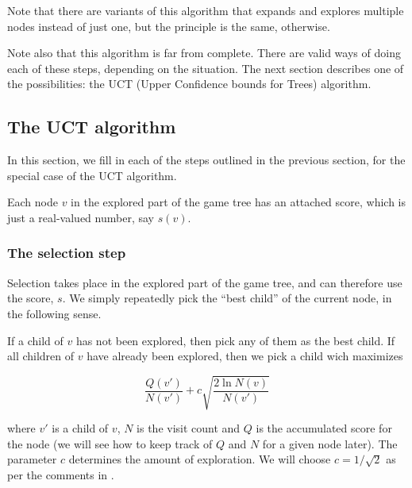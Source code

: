 Note that there are variants of this algorithm that expands and explores multiple nodes instead of just one, but the principle is the same, otherwise.

Note also that this algorithm is far from complete. There are valid ways of doing each of these steps, depending on the situation.
The next section describes one of the possibilities: the UCT (Upper Confidence bounds for Trees) algorithm.


\subsection{The UCT algorithm}

In this section, we fill in each of the steps outlined in the previous section, for the special case of the UCT algorithm.


Each node $v$ in the explored part of the game tree has an attached score, which is just a real-valued number, say $s(v)$.


\subsubsection{The selection step}

Selection takes place in the explored part of the game tree, and can therefore use the score, $s$.
We simply repeatedly pick the ``best child'' of the current node, in the following sense.

If a child of $v$ has not been explored, then pick any of them as the best child.
If all children of $v$ have already been explored, then we pick a child wich maximizes 

\[
\frac{Q(v')}{N(v')} + c\sqrt{\frac{2\ln{N(v)}}{N(v')}}
\] 


where $v'$ is a child of $v$, $N$ is the visit count and $Q$ is the accumulated score for the node (we will see how to keep track of $Q$ and $N$ for a given node later).
The parameter $c$ determines the amount of exploration. We will choose $c = 1 / \sqrt 2$ as per the comments in \citep[p. 9]{mcts_survey12}.
